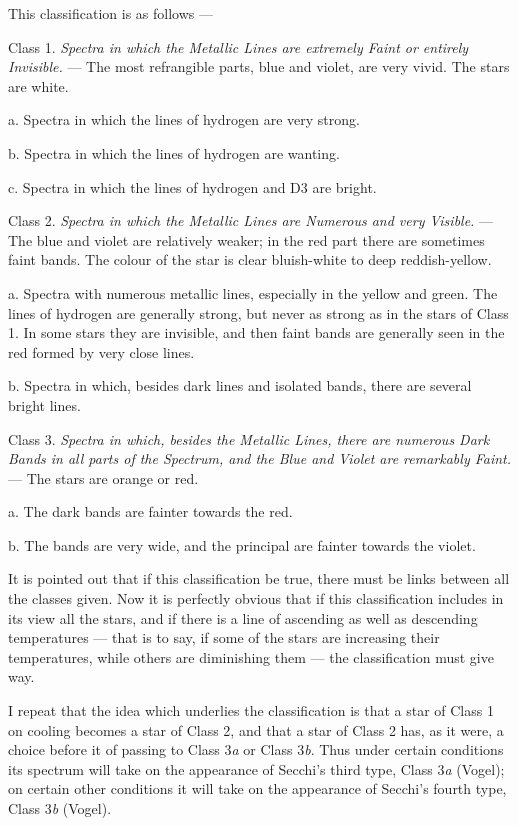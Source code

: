 \documentclass[a4paper, 12pt, oneside, polutonikogreek, english]{article}
\begin{document}
This classification is as follows ---

Class 1. \emph{Spectra in which the Metallic Lines are extremely Faint or entirely Invisible.} --- The most refrangible parts, blue and violet, are very vivid. The stars are white.

a. Spectra in which the lines of hydrogen are very strong.

b. Spectra in which the lines of hydrogen are wanting.

c. Spectra in which the lines of hydrogen and D3 are bright.

Class 2. \emph{Spectra in which the Metallic Lines are Numerous and very Visible.} --- The blue and violet are relatively weaker; in the red part there are sometimes faint bands. The colour of the star is clear bluish-white to deep reddish-yellow.

a. Spectra with numerous metallic lines, especially in the yellow and green. The lines of hydrogen are generally strong, but never as strong as in the stars of Class 1. In some stars they are invisible, and then faint bands are generally seen in the red formed by very close lines.

b. Spectra in which, besides dark lines and isolated bands, there are several bright lines.

Class 3. \emph{Spectra in which, besides the Metallic Lines, there are numerous Dark Bands in all parts of the Spectrum, and the Blue and Violet are remarkably Faint.} --- The stars are orange or red.

a. The dark bands are fainter towards the red.

b. The bands are very wide, and the principal are fainter towards the violet.

It is pointed out that if this classification be true, there must be links between all the classes given. Now it is perfectly obvious that if this classification includes in its view all the stars, and if there is a line of ascending as well as descending temperatures --- that is to say, if some of the stars are increasing their temperatures, while others are diminishing them --- the classification must give way.

I repeat that the idea which underlies the classification is that a star of Class 1 on cooling becomes a star of Class 2, and that a star of Class 2 has, as it were, a choice before it of passing to Class 3\emph{a} or Class 3\emph{b}. Thus under certain conditions its spectrum will take on the appearance of Secchi's third type, Class 3\emph{a} (Vogel); on certain other conditions it will take on the appearance of Secchi's fourth type, Class 3\emph{b} (Vogel).
\end{document}
